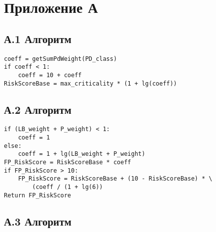 \documentclass[../main]{subfiles}
\begin{document}
\newpage

\section*{Приложение А}
{}

\label{sec:appendix11}
\subsection*{А.1 Алгоритм}

\begin{lstlisting}
coeff = getSumPdWeight(PD_class)
if coeff < 1:
    coeff = 10 + coeff
RiskScoreBase = max_criticality * (1 + lg(coeff))
\end{lstlisting}


\label{sec:appendix12}
\subsection*{А.2 Алгоритм}

\begin{lstlisting}
if (LB_weight + P_weight) < 1:
    coeff = 1 
else:
    coeff = 1 + lg(LB_weight + P_weight)
FP_RiskScore = RiskScoreBase * coeff
if FP_RiskScore > 10:
    FP_RiskScore = RiskScoreBase + (10 - RiskScoreBase) * \ 
        (coeff / (1 + lg(6))
Return FP_RiskScore
\end{lstlisting}

\label{sec:appendix13}
\subsection*{А.3 Алгоритм}
\end{document}
